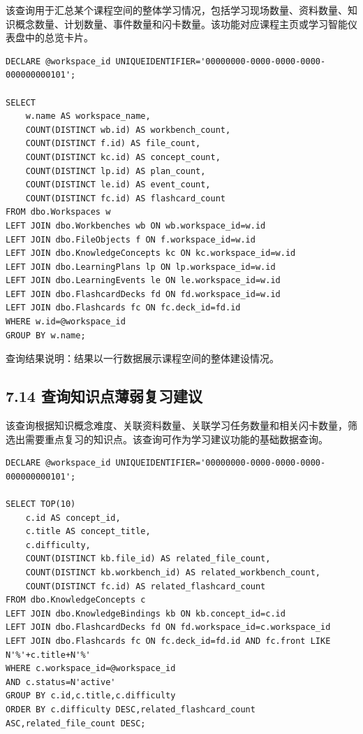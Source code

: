 \documentclass[10pt,a4paper,fontset=none]{ctexart}
\begin{document}
该查询用于汇总某个课程空间的整体学习情况，包括学习现场数量、资料数量、知识概念数量、计划数量、事件数量和闪卡数量。该功能对应课程主页或学习智能仪表盘中的总览卡片。\par

\begin{Verbatim}[fontsize=\scriptsize,frame=single]
DECLARE @workspace_id UNIQUEIDENTIFIER='00000000-0000-0000-0000-000000000101';

SELECT
    w.name AS workspace_name,
    COUNT(DISTINCT wb.id) AS workbench_count,
    COUNT(DISTINCT f.id) AS file_count,
    COUNT(DISTINCT kc.id) AS concept_count,
    COUNT(DISTINCT lp.id) AS plan_count,
    COUNT(DISTINCT le.id) AS event_count,
    COUNT(DISTINCT fc.id) AS flashcard_count
FROM dbo.Workspaces w
LEFT JOIN dbo.Workbenches wb ON wb.workspace_id=w.id
LEFT JOIN dbo.FileObjects f ON f.workspace_id=w.id
LEFT JOIN dbo.KnowledgeConcepts kc ON kc.workspace_id=w.id
LEFT JOIN dbo.LearningPlans lp ON lp.workspace_id=w.id
LEFT JOIN dbo.LearningEvents le ON le.workspace_id=w.id
LEFT JOIN dbo.FlashcardDecks fd ON fd.workspace_id=w.id
LEFT JOIN dbo.Flashcards fc ON fc.deck_id=fd.id
WHERE w.id=@workspace_id
GROUP BY w.name;
\end{Verbatim}

查询结果说明：结果以一行数据展示课程空间的整体建设情况。\par

\subsection*{7.14 查询知识点薄弱复习建议}

该查询根据知识概念难度、关联资料数量、关联学习任务数量和相关闪卡数量，筛选出需要重点复习的知识点。该查询可作为学习建议功能的基础数据查询。\par

\begin{Verbatim}[fontsize=\scriptsize,frame=single]
DECLARE @workspace_id UNIQUEIDENTIFIER='00000000-0000-0000-0000-000000000101';

SELECT TOP(10)
    c.id AS concept_id,
    c.title AS concept_title,
    c.difficulty,
    COUNT(DISTINCT kb.file_id) AS related_file_count,
    COUNT(DISTINCT kb.workbench_id) AS related_workbench_count,
    COUNT(DISTINCT fc.id) AS related_flashcard_count
FROM dbo.KnowledgeConcepts c
LEFT JOIN dbo.KnowledgeBindings kb ON kb.concept_id=c.id
LEFT JOIN dbo.FlashcardDecks fd ON fd.workspace_id=c.workspace_id
LEFT JOIN dbo.Flashcards fc ON fc.deck_id=fd.id AND fc.front LIKE N'%'+c.title+N'%'
WHERE c.workspace_id=@workspace_id
AND c.status=N'active'
GROUP BY c.id,c.title,c.difficulty
ORDER BY c.difficulty DESC,related_flashcard_count ASC,related_file_count DESC;
\end{Verbatim}
\end{document}

